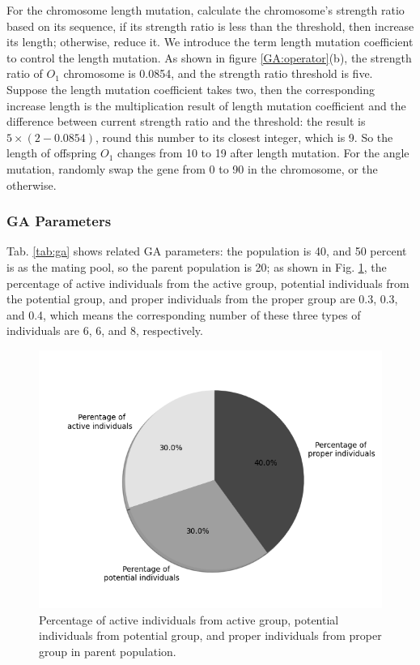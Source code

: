 For the chromosome length mutation, calculate the chromosome's strength ratio
based on its sequence, if its strength ratio is less than the threshold, then
increase its length; otherwise, reduce it. We introduce the term length
mutation coefficient to control the length mutation.  As shown in figure
\ref{GA:operator}(b), the strength ratio of $O_1$ chromosome is 0.0854, and the
strength ratio threshold is five. Suppose the length mutation coefficient takes
two, then the corresponding increase length is the multiplication result of
length mutation coefficient and the difference between current strength ratio
and the threshold: the result is $5\times(2-0.0854)$, round this number to its
closest integer, which is 9. So the length of offspring $O_1$ changes from 10
to 19 after length mutation.  For the angle mutation, randomly swap the gene
from 0 to 90 in the chromosome, or the otherwise.


\subsubsection{GA Parameters}
Tab. \ref{tab:ga} shows related GA parameters: the population is 40, and 50
percent is as the mating pool, so the parent population is 20; as
shown in Fig. \ref{fig:percentage}, the percentage of active individuals from
the active group, potential individuals from the potential group, and proper
individuals from the proper group are 0.3, 0.3, and 0.4, which means the
corresponding number of these three types of individuals are 6, 6, and 8,
respectively.

\begin{figure}[!tb]
	\centering
	\includegraphics[width=\linewidth]{Figures/chapter3/part1/fig/percentage_of_groups}
	\caption{Percentage of active individuals from active group, potential
	  individuals from potential group, and proper individuals from proper group
	 in parent population.}
	 \label{fig:percentage}
\end{figure}



